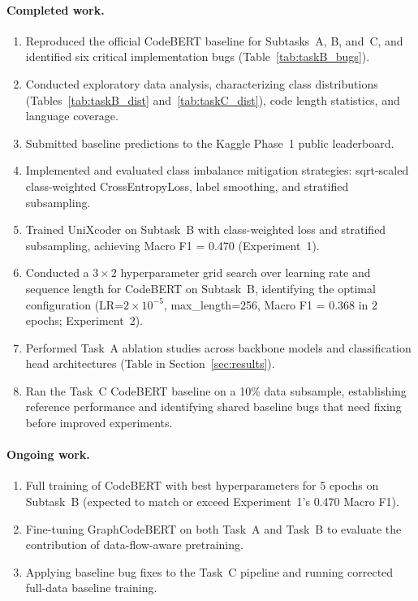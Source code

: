 \documentclass[11pt]{article}
\begin{document}
\paragraph{Completed work.}
\begin{enumerate}
    \item Reproduced the official CodeBERT baseline for Subtasks~A, B, and~C, and identified six critical implementation bugs (Table~\ref{tab:taskB_bugs}).
    \item Conducted exploratory data analysis, characterizing class distributions (Tables~\ref{tab:taskB_dist} and~\ref{tab:taskC_dist}), code length statistics, and language coverage.
    \item Submitted baseline predictions to the Kaggle Phase~1 public leaderboard.
    \item Implemented and evaluated class imbalance mitigation strategies: sqrt-scaled class-weighted CrossEntropyLoss, label smoothing, and stratified subsampling.
    \item Trained UniXcoder on Subtask~B with class-weighted loss and stratified subsampling, achieving Macro F1 = 0.470 (Experiment~1).
    \item Conducted a $3 \times 2$ hyperparameter grid search over learning rate and sequence length for CodeBERT on Subtask~B, identifying the optimal configuration (LR=$2{\times}10^{-5}$, max\_length=256, Macro F1 = 0.368 in 2 epochs; Experiment~2).
    \item Performed Task~A ablation studies across backbone models and classification head architectures (Table in Section~\ref{sec:results}).
    \item Ran the Task~C CodeBERT baseline on a 10\% data subsample, establishing reference performance and identifying shared baseline bugs that need fixing before improved experiments.
\end{enumerate}

\paragraph{Ongoing work.}
\begin{enumerate}
    \item Full training of CodeBERT with best hyperparameters for 5 epochs on Subtask~B (expected to match or exceed Experiment~1's 0.470 Macro F1).
    \item Fine-tuning GraphCodeBERT on both Task~A and Task~B to evaluate the contribution of data-flow-aware pretraining.
    \item Applying baseline bug fixes to the Task~C pipeline and running corrected full-data baseline training.
\end{enumerate}
\end{document}
